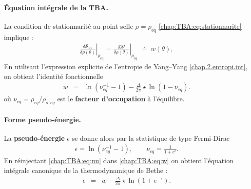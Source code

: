 


\paragraph{Équation intégrale de la TBA.}

La condition de stationnarité au point selle \(\rho=\rho_{\mathrm{eq}}\) \eqref{chap:TBA:eq:stationnarite} implique :
\begin{eqnarray}
	\left.\frac{\delta\mathcal{S}_{YY}}{\delta\rho(\theta)}\right|_{\rho_{\mathrm{eq}}} = \left.\frac{\delta\mathcal{W}}{\delta\rho(\theta)}\right|_{\rho_{\mathrm{eq}}}\;\doteq\;w(\theta),
\end{eqnarray}
En utilisant l’expression explicite de l’entropie de Yang–Yang \eqref{chap.2.entropi.int}, on obtient l’identité fonctionnelle
\begin{eqnarray}
	w & = & \ln ( \nu_{\!eq}^{-1}  - 1 ) - \frac{\Delta}{2\pi} \star \ln ( 1 -  \nu_{\!eq}).\label{chap:TBA:eq:w}
\end{eqnarray}
où
\(
\nu_{\!eq}=\rho_{\!eq}/\rho_{s,\!eq}
\)
est le \textbf{facteur d’occupation} à l’équilibre.
\paragraph{Forme pseudo-énergie.}
La \textbf{pseudo-énergie} $\epsilon$ se donne alors par la statistique de type Fermi-Dirac
\begin{eqnarray}
	\epsilon =\ln(\nu^{-1}_{\!eq}-1),\qquad\nu_{\!eq}=\frac{1}{1+e^{\epsilon}}.\label{chap:TBA:eq:nu}%
\end{eqnarray}
En réinjectant \eqref{chap:TBA:eq:nu} dans \eqref{chap:TBA:eq:w} on obtient
l’équation intégrale canonique de la thermodynamique de Bethe :
\begin{eqnarray}
	\epsilon & = & w - \frac{\Delta}{2\pi} \star \ln ( 1  + e^{-\epsilon}).\label{chap:TBA:eq:e}%
\end{eqnarray}

